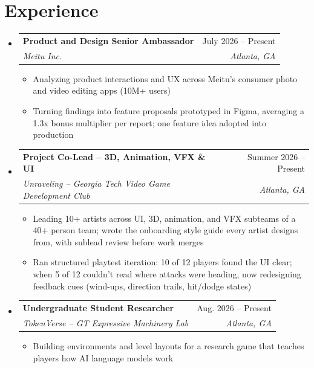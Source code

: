 \documentclass[letterpaper,11pt]{article}
\makeatletter
\newcommand{\resumeItem}[1]{
  \item\small{
    {#1 \vspace{-2pt}}
  }
}
\newcommand{\resumeSubheading}[4]{
  \vspace{-2pt}\item
    \begin{tabular*}{0.97\textwidth}[t]{l@{\extracolsep{\fill}}r}
      \textbf{#1} & #2 \\
      \textit{\small#3} & \textit{\small #4} \\
    \end{tabular*}\vspace{-7pt}
}
\newcommand{\resumeSubHeadingListStart}{\begin{itemize}[leftmargin=0.15in, label={}]}
\newcommand{\resumeSubHeadingListEnd}{\end{itemize}}
\newcommand{\resumeItemListStart}{\begin{itemize}}
\newcommand{\resumeItemListEnd}{\end{itemize}\vspace{-5pt}}
\makeatother
\begin{document}
\section{Experience}
  \resumeSubHeadingListStart

    \resumeSubheading
      {Product and Design Senior Ambassador}{July 2026 -- Present}
      {Meitu Inc.}{Atlanta, GA}
      \resumeItemListStart
        \resumeItem{Analyzing product interactions and UX across Meitu's consumer photo and video editing apps (10M+ users)}
        \resumeItem{Turning findings into feature proposals prototyped in Figma, averaging a 1.3x bonus multiplier per report; one feature idea adopted into production}
      \resumeItemListEnd

    \resumeSubheading
      {Project Co-Lead -- 3D, Animation, VFX \& UI}{Summer 2026 -- Present}
      {Unraveling -- Georgia Tech Video Game Development Club}{Atlanta, GA}
      \resumeItemListStart
        \resumeItem{Leading 10+ artists across UI, 3D, animation, and VFX subteams of a 40+ person team; wrote the onboarding style guide every artist designs from, with sublead review before work merges}
        \resumeItem{Ran structured playtest iteration: 10 of 12 players found the UI clear; when 5 of 12 couldn't read where attacks were heading, now redesigning feedback cues (wind-ups, direction trails, hit/dodge states)}
      \resumeItemListEnd

    \resumeSubheading
      {Undergraduate Student Researcher}{Aug. 2026 -- Present}
      {TokenVerse -- GT Expressive Machinery Lab}{Atlanta, GA}
      \resumeItemListStart
        \resumeItem{Building environments and level layouts for a research game that teaches players how AI language models work}
      \resumeItemListEnd

  \resumeSubHeadingListEnd


\end{document}

